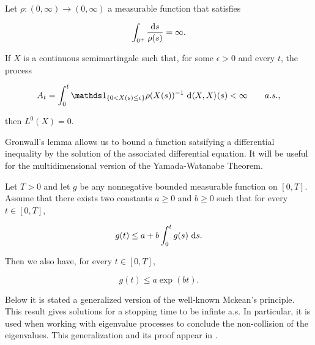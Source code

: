 \begin{theorem} \label{thm:local_zero} 
    Let  $\rho : (0,\infty) \to (0,\infty)$ a measurable function that satisfies 

    \begin{equation*}
        \int_{0^+} \frac{\mathrm d s}{\rho(s)} = \infty.
    \end{equation*}


    If $X$ is a continuous semimartingale such that, for some $\epsilon > 0$ and every $t$, the process

    \begin{equation*}
        A_t = \int_0^t \mathds 1_{\{0 < X(s) \le \epsilon\}} \rho(X(s))^{-1} ~\d \langle X, X \rangle (s) < \infty \qquad a.s.,
    \end{equation*}

    \noindent then $L^0(X) = 0$.
\end{theorem}

Gronwall's lemma allows us to bound a function satsifying a differential inequality by the solution of the associated differential equation. It will be  useful for the multidimensional version of the Yamada-Watanabe Theorem.


\begin{lemma} 
    \label{lemma:gronwall} 
    Let $T >0$ and let $g$ be any nonnegative bounded measurable function on $[0,T]$. Assume that there exists two constants $a\ge 0$ and $b\ge 0$ such that for every $t\in [0,T]$,

    \[ g(t) \le a + b\int_0^t g(s)~\mathrm d s. \]

    Then we also have, for every $t \in [0,T]$,

    \[ g(t) \le a \exp(bt). \]
\end{lemma}

Below it is stated a generalized version of the well-known Mckean's principle. This result gives solutions for a stopping time to be infinte a.s. In particular, it is used when working with eigenvalue processes to conclude the non-collision of the eigenvalues. This generalization and its proof appear in \cite{mayerhofer2011strong}.

